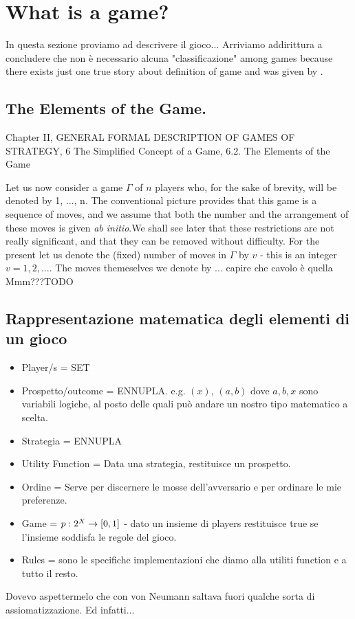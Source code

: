 \chapter{What is a game?}
In questa sezione proviamo ad descrivere il gioco... 
Arriviamo addirittura a concludere che non \`e necessario alcuna "classificazione" among games because there exists just one true story about definition of game and was given by \cite{vonNeumann1944}.

\section{The Elements of the Game. \cite{vonNeumann1944}}
Chapter II, GENERAL FORMAL DESCRIPTION OF GAMES OF STRATEGY, 6 The Simplified Concept of a Game, 6.2. The Elements of the Game

Let us now consider a game $\Gamma$ of $n$ players who, for the sake of brevity, will be denoted by 1, ..., n. The conventional picture provides that this game is a sequence of moves, and we assume that both the number and the arrangement of these moves is given \emph{ab initio}.We shall see later that these restrictions are not really significant, and that they can be removed without difficulty. For the present let us denote the (fixed) number of moves in $\Gamma$ by $v$ - this is an integer $v=1,2,...$. The moves themeselves we denote by ... capire che cavolo \`e quella Mmm???TODO

\section{Rappresentazione matematica degli elementi di un gioco}
\begin{itemize}
 \item Player/s          = SET
 \item Prospetto/outcome = ENNUPLA. e.g. $(x)$, $(a,b)$ dove $a, b, x$ sono variabili logiche, al posto delle quali pu\`o andare un nostro tipo matematico a scelta.
 \item Strategia         = ENNUPLA
 \item Utility Function  = Data una strategia, restituisce un prospetto.
 \item Ordine            = Serve per discernere le mosse dell'avversario e per ordinare le mie preferenze.
 \item Game              = $p:2^X \to [0,1]$ - dato un insieme di players restituisce true se l'insieme soddisfa le regole del gioco.
 \item Rules             = sono le specifiche implementazioni che diamo alla utiliti function e a tutto il resto.
\end{itemize}


Dovevo aspettermelo che con von Neumann saltava fuori qualche sorta di assiomatizzazione. Ed infatti...